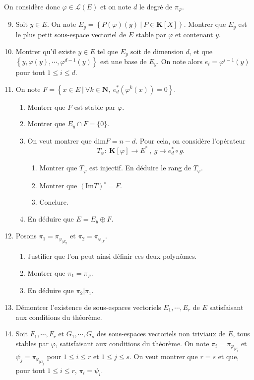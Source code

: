 \documentclass[a4paper,11pt]{article}
\newcommand{\N}{\mathbf{N}}
\newcommand{\K}{\mathbf{K}}
\renewcommand{\L}{\mathcal{L}}
\begin{document}
On considère donc $\varphi\in\L(E)$ et on note $d$ le degré de $\pi_\varphi$.
\begin{enumerate}
\setcounter{enumi}{8}
\item Soit $y\in E$. On note $E_y=\left\lbrace P(\varphi)(y)\ \vert\ P\in\K[X]\right\rbrace$. Montrer que $E_y$ est le plus petit sous-espace vectoriel de $E$ stable par $\varphi$ et contenant $y$.
\item Montrer qu'il existe $y\in E$ tel que $E_y$ soit de dimension $d$, et que $\left\lbrace y,\varphi(y),\cdots,\varphi^{d-1}(y)\right\rbrace$ est une base de $E_y$. On note alors $e_i=\varphi^{i-1}(y)$ pour tout $1\leq i\leq d$.
\item On note $F=\left\lbrace x\in E\ \vert\ \forall k\in\N,\ e^*_d\left(\varphi^k(x)\right)=0\right\rbrace$. 
\begin{enumerate}
\item Montrer que $F$ est stable par $\varphi$.
\item Montrer que $E_y\cap F=\{ 0\}$.
\item On veut montrer que $\mathrm{dim}F=n-d$. Pour cela, on considère l'opérateur
\[T_\varphi:\ \K[\varphi]\rightarrow E^*\ ,\ g\mapsto e^*_d\circ g.\]
\begin{enumerate}
\item Montrer que $T_\varphi$ est injectif. En déduire le rang de $T_\varphi$.
\item Montrer que $\left(\mathrm{Im}T\right)^\circ=F$.
\item Conclure.
\end{enumerate}
\item En déduire que $E=E_y\oplus F$.
\end{enumerate}
\item Posons $\pi_1=\pi_{\varphi_{\vert E_y}}$ et $\pi_2=\pi_{\varphi_{\vert F}}$.
\begin{enumerate}
\item Justifier que l'on peut ainsi définir ces deux polynômes.
\item Montrer que $\pi_1=\pi_\varphi$.
\item En déduire que $\pi_2\vert\pi_1$.
\end{enumerate}
\item Démontrer l'existence de sous-espaces vectoriels $E_1,\cdots,E_r$ de $E$ satisfaisant aux conditions du théorème.
\item Soit $F_1,\cdots,F_r$ et $G_1,\cdots,G_s$ des sous-espaces vectoriels non triviaux de $E$, tous stables par $\varphi$, satisfaisant aux conditions du théorème. On note $\pi_i=\pi_{\varphi_{\vert F_i}}$ et $\psi_j=\pi_{\varphi_{\vert G_j}}$ pour $1\leq i\leq r$ et $1\leq j\leq s$. On veut montrer que $r=s$ et que, pour tout $1\leq i\leq r$, $\pi_i=\psi_i$.

\end{enumerate}
\end{document}
